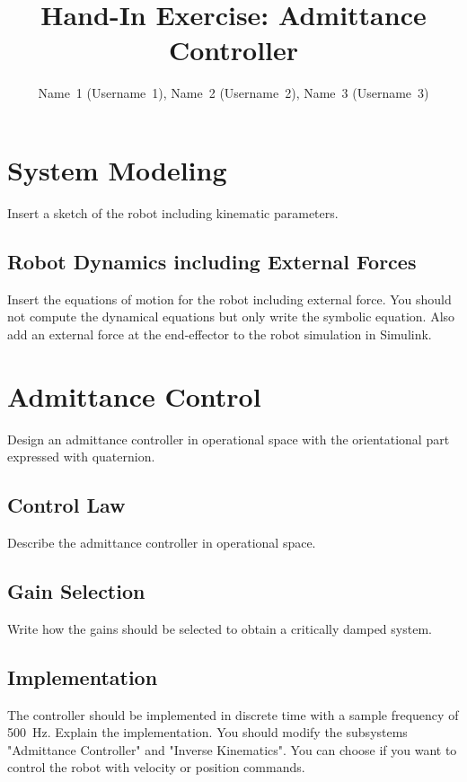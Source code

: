 \documentclass[a4paper,10pt,oneside]{article}
\begin{document}
\title{Hand-In Exercise: Admittance Controller}
\author{{\color{red}Name~1 (Username~1), Name~2 (Username~2), Name~3 (Username~3)}}
\date{}
\maketitle

\section{System Modeling}
{\color{red}Insert a sketch of the robot including kinematic parameters.}
\subsection{Robot Dynamics including External Forces}
{\color{red}Insert the equations of motion for the robot including external force. You should not compute the dynamical equations but only write the symbolic equation. }
{\color{red}Also add an external force at the end-effector to the robot simulation in Simulink.}


\section{Admittance Control}
{\color{red}Design an admittance controller in operational space with the orientational part expressed with quaternion.}
\subsection{Control Law}
{\color{red}Describe the admittance controller in operational space.}

\subsection{Gain Selection}
{\color{red}Write how the gains should be selected to obtain a critically damped system.}

\subsection{Implementation}
{\color{red}The controller should be implemented in discrete time with a sample frequency of 500~Hz. Explain the implementation. You should modify the subsystems "Admittance Controller" and "Inverse Kinematics". You can choose if you want to control the robot with velocity or position commands.}
\end{document}
